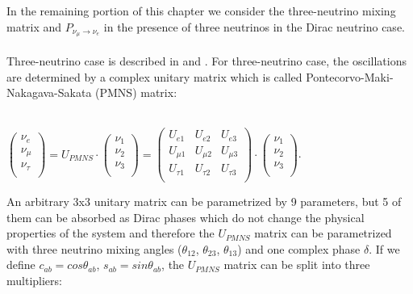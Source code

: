 In the remaining portion of this chapter we consider the three-neutrino mixing matrix and $P_{\nu_\mu \rightarrow \nu_e}$ in the presence of three neutrinos in the Dirac neutrino case.\\ \\ 
Three-neutrino case is described in \cite{ref_theory_Osc} and \cite{ref_LBNF_CDR}. For three-neutrino case, the oscillations are determined by a complex unitary matrix which is called Pontecorvo-Maki-Nakagava-Sakata (PMNS) matrix:\\ \\
\begin{center}
$ \begin{pmatrix} \nu_{e} \\ \nu_{\mu} \\ \nu_{\tau} \\ \end{pmatrix}
 = U_{PMNS}\cdot \begin{pmatrix} \nu_{1} \\ \nu_{2} \\ \nu_{3} \\ \end{pmatrix} = 
 \begin{pmatrix}
  U_{e1} & U_{e2} & U_{e3} \\
  U_{\mu1} & U_{\mu2} & U_{\mu3} \\
  U_{\tau1} & U_{\tau2} & U_{\tau3} \\
 \end{pmatrix}
 \cdot
\begin{pmatrix} \nu_{1} \\ \nu_{2} \\ \nu_{3} \\ \end{pmatrix}$.\\
\end{center}
An arbitrary 3x3 unitary matrix can be parametrized by 9 parameters, but 5 of them can be absorbed as Dirac phases which do not change the physical properties of the system and therefore the $U_{PMNS}$ matrix can be parametrized with three neutrino mixing angles ($\theta_{12}$, $\theta_{23}$, $\theta_{13}$) and one complex phase $\delta$. If we define $c_{ab}=cos\theta_{ab}$, $s_{ab}=sin\theta_{ab}$, the $U_{PMNS}$ matrix can be split into three multipliers:\\ 

